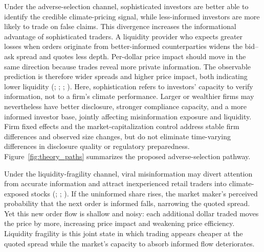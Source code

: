 \documentclass{article}
\theoremstyle{plain}
\begin{document}
Under the adverse-selection channel, sophisticated investors are better able to identify the credible climate-pricing signal, while less-informed investors are more likely to trade on false claims. This divergence increases the informational advantage of sophisticated traders. A liquidity provider who expects greater losses when orders originate from better-informed counterparties widens the bid--ask spread and quotes less depth. Per-dollar price impact should move in the same direction because trades reveal more private information. The observable prediction is therefore wider spreads and higher price impact, both indicating lower liquidity (\cite{grossman1980impossibility}; \cite{chordia2000commonality}; \cite{Han2022}; \cite{bordalo2020}). Here, sophistication refers to investors' capacity to verify information, not to a firm's climate performance. Larger or wealthier firms may nevertheless have better disclosure, stronger compliance capacity, and a more informed investor base, jointly affecting misinformation exposure and liquidity. Firm fixed effects and the market-capitalization control address stable firm differences and observed size changes, but do not eliminate time-varying differences in disclosure quality or regulatory preparedness. Figure~\ref{fig:theory_paths} summarizes the proposed adverse-selection pathway.

Under the liquidity-fragility channel, viral misinformation may divert attention from accurate information and attract inexperienced retail traders into climate-exposed stocks (\cite{barber2008all}; \cite{PengXiong2006}; \cite{sims2003}). If the uninformed share rises, the market maker's perceived probability that the next order is informed falls, narrowing the quoted spread. Yet this new order flow is shallow and noisy: each additional dollar traded moves the price by more, increasing price impact and weakening price efficiency. Liquidity fragility is this joint state in which trading appears cheaper at the quoted spread while the market's capacity to absorb informed flow deteriorates.
\end{document}
